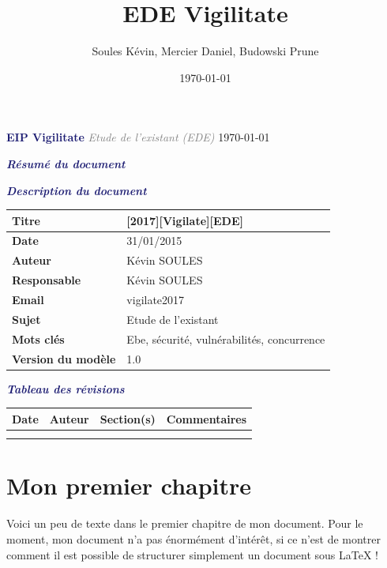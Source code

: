 \documentclass[a4paper,11pt]{report}
\title{EDE Vigilitate}
\author{Soules Kévin, Mercier Daniel, Budowski Prune}
\date{\today}
\begin{document}

\begin{center}\textcolor{MidnightBlue}{\LARGE \textbf{EIP Vigilitate}}\linebreak
{}
\textcolor{gray}{\textit{\Large Etude de l'existant (EDE)}}\linebreak
{}
{\today}\end{center}
\newpage
\textcolor{MidnightBlue}{\textit{\large \textbf{Résumé du document}}}
\newpage
\begin{flushleft}
\textcolor{MidnightBlue}{\textit{\large \textbf{Description du document}}}\linebreak



\begin{tabular}{|>{\columncolor[RGB]{220,220,220}\color{Navy}\bfseries}l|l|}
\hline
Titre & [2017][Vigilate][EDE] \\
\hline
Date & 31/01/2015 \\
\hline
Auteur & Kévin SOULES \\
\hline
Responsable & Kévin SOULES\\
\hline
Email & vigilate2017\\
\hline
Sujet & Etude de l'existant\\
\hline
Mots clés & Ebe, sécurité, vulnérabilités, concurrence\\
\hline
Version du modèle & 1.0\\
\hline
\end{tabular}
\bigbreak

\textcolor{MidnightBlue}{\textit{\large \textbf{Tableau des révisions}}}
\bigbreak
\begin{tabular}{|l|l|l|l|}
  \hline
 
   \rowcolor{Gainsboro}Date  & Auteur & Section(s) & Commentaires \\
  \hline
  &  &  & \\
  &  & &  \\
  \hline
\end{tabular}
\end{flushleft}
\tableofcontents
 \thispagestyle{fancy}
\chapter{Mon premier chapitre}
 \thispagestyle{fancy}
    Voici un peu de texte dans le premier chapitre de mon document. Pour le moment, mon document n'a pas énormément d'intérêt, si ce n'est de montrer comment il est possible de structurer simplement un document sous LaTeX !
\end{document}
